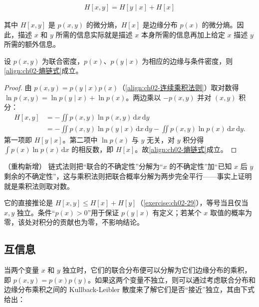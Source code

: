\documentclass[../../main.tex]{subfiles}
\begin{document}
\begin{align}
  H[x,y] = H[y\mid x] + H[x]
  \label{align:ch02-熵链式}
\end{align}

其中 $H[x,y]$ 是 $p(x,y)$ 的微分熵，$H[x]$ 是边缘分布 $p(x)$ 的微分熵。因此，描述 $x$ 和 $y$ 所需的信息实际就是描述 $x$ 本身所需的信息再加上给定 $x$ 描述 $y$ 所需的额外信息。

\begin{proposition}[熵的链式法则]\label{proposition:ch02-熵链式}
设 $p(x,y)$ 为联合密度，$p(x)$、$p(y\mid x)$ 为相应的边缘与条件密度，则\eqref{align:ch02-熵链式}成立。
\end{proposition}

\begin{proof}
由 $p(x,y)=p(y\mid x)p(x)$（\eqref{align:ch02-连续乘积法则}）取对数得 $\ln p(x,y)=\ln p(y\mid x)+\ln p(x)$。两边乘以 $-p(x,y)$ 并对 $(x,y)$ 积分：
\begin{align*}
  H[x,y] &= -\iint p(x,y)\ln p(x,y)\,\mathrm{d}x\,\mathrm{d}y \\
  &= -\iint p(x,y)\ln p(y\mid x)\,\mathrm{d}x\,\mathrm{d}y - \iint p(x,y)\ln p(x)\,\mathrm{d}x\,\mathrm{d}y .
\end{align*}
第一项即 $H[y\mid x]$。第二项中 $\ln p(x)$ 与 $y$ 无关，对 $y$ 积分得 $\int p(x)\ln p(x)\,\mathrm{d}x$ 的相反数，即 $H[x]$。故\eqref{align:ch02-熵链式}成立。
\end{proof}

\begin{remark}（重构新增）
链式法则把“联合的不确定性”分解为“$x$ 的不确定性”加“已知 $x$ 后 $y$ 剩余的不确定性”，这与乘积法则把联合概率分解为两步完全平行——事实上证明就是乘积法则取对数。

它的直接推论是 $H[x,y]\leqslant H[x]+H[y]$（\cref{exercise:ch02-29}），等号当且仅当 $x,y$ 独立。条件“$p(x)>0$”用于保证 $p(y\mid x)$ 有定义；若某个 $x$ 取值的概率为零，该处对积分的贡献也为零，不影响结论。
\end{remark}

\subsection{互信息}\label{subsection:ch02-互信息}

当两个变量 $x$ 和 $y$ 独立时，它们的联合分布便可以分解为它们边缘分布的乘积，即 $p(x,y)=p(x)p(y)$。如果这两个变量不独立，则可以通过考虑联合分布和边缘分布乘积之间的 Kullback-Leibler 散度来了解它们是否“接近”独立，其由下式给出：
\end{document}
